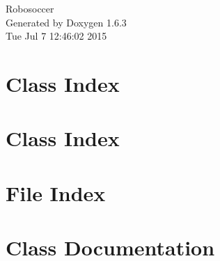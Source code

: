 \documentclass[a4paper]{book}
\begin{document}
\hypersetup{pageanchor=false}
\begin{titlepage}
\vspace*{7cm}
\begin{center}
{\Large Robosoccer }\\
\vspace*{1cm}
{\large Generated by Doxygen 1.6.3}\\
\vspace*{0.5cm}
{\small Tue Jul 7 12:46:02 2015}\\
\end{center}
\end{titlepage}
\clearemptydoublepage
{}
\tableofcontents
\clearemptydoublepage
{}
\hypersetup{pageanchor=true}
\chapter{Class Index}

\chapter{Class Index}

\chapter{File Index}

\chapter{Class Documentation}































\end{document}
